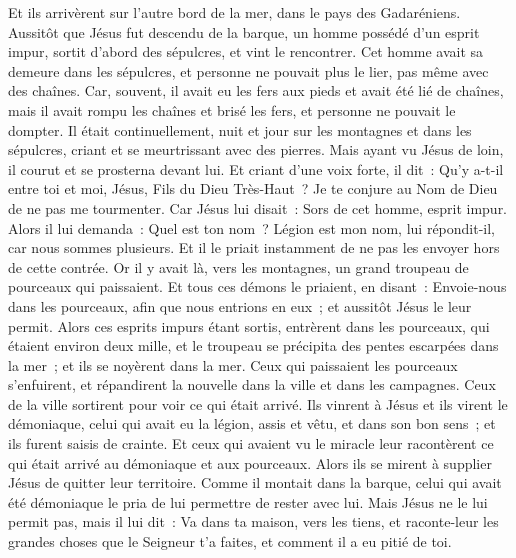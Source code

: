 \begin{multicols}{2}
\VerseOne{}Et ils arrivèrent sur l'autre bord de la mer, dans le pays des Gadaréniens.
Aussitôt que Jésus fut descendu de la barque, un homme possédé d'un esprit impur, sortit d'abord des sépulcres, et vint le rencontrer.
Cet homme avait sa demeure dans les sépulcres, et personne ne pouvait plus le lier, pas même avec des chaînes.
Car, souvent, il avait eu les fers aux pieds et avait été lié de chaînes, mais il avait rompu les chaînes et brisé les fers, et personne ne pouvait le dompter.
Il était continuellement, nuit et jour sur les montagnes et dans les sépulcres, criant et se meurtrissant avec des pierres.
Mais ayant vu Jésus de loin, il courut et se prosterna devant lui.
Et criant d'une voix forte, il dit~: Qu'y a-t-il entre toi et moi, Jésus, Fils du Dieu Très-Haut~? Je te conjure au Nom de Dieu de ne pas me tourmenter.
Car Jésus lui disait~: Sors de cet homme, esprit impur.
Alors il lui demanda~: Quel est ton nom~? Légion est mon nom, lui répondit-il, car nous sommes plusieurs.
Et il le priait instamment de ne pas les envoyer hors de cette contrée.
Or il y avait là, vers les montagnes, un grand troupeau de pourceaux qui paissaient.
Et tous ces démons le priaient, en disant~: Envoie-nous dans les pourceaux, afin que nous entrions en eux~;
et aussitôt Jésus le leur permit. Alors ces esprits impurs étant sortis, entrèrent dans les pourceaux, qui étaient environ deux mille, et le troupeau se précipita des pentes escarpées dans la mer~; et ils se noyèrent dans la mer.
Ceux qui paissaient les pourceaux s'enfuirent, et répandirent la nouvelle dans la ville et dans les campagnes. Ceux de la ville sortirent pour voir ce qui était arrivé.
Ils vinrent à Jésus et ils virent le démoniaque, celui qui avait eu la légion, assis et vêtu, et dans son bon sens~; et ils furent saisis de crainte.
Et ceux qui avaient vu le miracle leur racontèrent ce qui était arrivé au démoniaque et aux pourceaux.
Alors ils se mirent à supplier Jésus de quitter leur territoire.
Comme il montait dans la barque, celui qui avait été démoniaque le pria de lui permettre de rester avec lui.
Mais Jésus ne le lui permit pas, mais il lui dit~: Va dans ta maison, vers les tiens, et raconte-leur les grandes choses que le Seigneur t'a faites, et comment il a eu pitié de toi.

\end{multicols}
